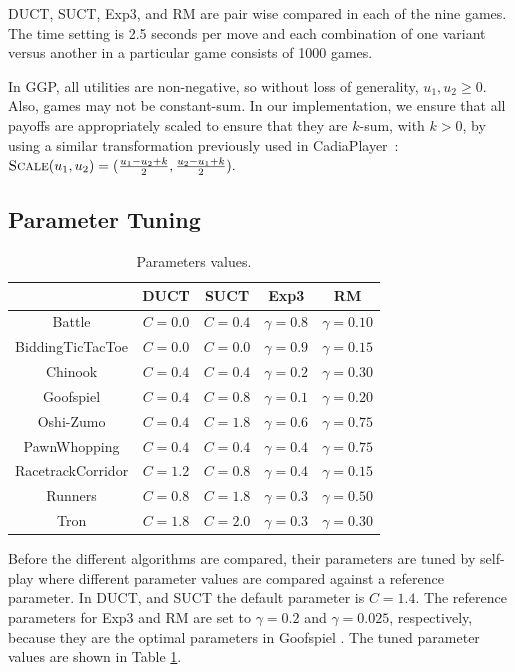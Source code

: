 \documentclass[conference]{IEEEtran}
\newcommand{\Cadiaplayer}{{\sc CadiaPlayer}\xspace}
\begin{document}
DUCT, SUCT, Exp3, and RM are pair wise compared in each of the nine games. The time setting is 2.5 seconds per move and 
each combination of one variant versus another in a particular game consists of 1000 games.  

In GGP, all utilities are non-negative, so without loss of generality, $u_1, u_2 \ge 0$.  
Also, games may not be constant-sum. In our implementation, we ensure that all payoffs 
are appropriately scaled to ensure that they are $k$-sum, with $k > 0$, by using 
a similar transformation previously used in \Cadiaplayer~\cite{Finnsson12}:
$\text{\sc Scale}(u_1, u_2) = (\frac{u_1 - u_2 + k}{2}, \frac{u_2 - u_1 + k}{2}).$

\subsection{Parameter Tuning}

\begin{table}[t!]
\centering
\begin{tabular}{|c|c|c|c|c|}
\hline
                  & DUCT    & SUCT    & Exp3           & RM  \\
\hline
Battle            & $C=0.0$ & $C=0.4$ & $\gamma = 0.8$ & $\gamma = 0.10$  \\ 
BiddingTicTacToe  & $C=0.0$ & $C=0.0$ & $\gamma = 0.9$ & $\gamma = 0.15$   \\ 
Chinook           & $C=0.4$ & $C=0.4$ & $\gamma = 0.2$ & $\gamma = 0.30$ \\ 
Goofspiel         & $C=0.4$ & $C=0.8$ & $\gamma = 0.1$ & $\gamma = 0.20$ \\ 
Oshi-Zumo         & $C=0.4$ & $C=1.8$ & $\gamma = 0.6$ & $\gamma = 0.75$ \\ 
PawnWhopping      & $C=0.4$ & $C=0.4$ & $\gamma = 0.4$ & $\gamma = 0.75$  \\ 
RacetrackCorridor & $C=1.2$ & $C=0.8$ & $\gamma = 0.4$ & $\gamma = 0.15$\\ 
Runners           & $C=0.8$ & $C=1.8$ & $\gamma = 0.3$ & $\gamma = 0.50$ \\
Tron              & $C=1.8$ & $C=2.0$ & $\gamma = 0.3$ & $\gamma = 0.30$ \\
 \hline
\end{tabular}
\caption{Parameters values. \label{tbl:parameters}}
\vspace{-1cm}
\end{table}


Before the different algorithms are compared, their parameters are tuned by self-play where different parameter 
values are compared against a reference parameter. In DUCT, and SUCT the default parameter is $C=1.4$. The reference
parameters for Exp3 and RM are set to $\gamma = 0.2$ and $\gamma = 0.025$, respectively, because they are the optimal 
parameters in Goofspiel \cite{Lanctot13Goofspiel}. The tuned parameter values are shown in Table \ref{tbl:parameters}. 
\end{document}
